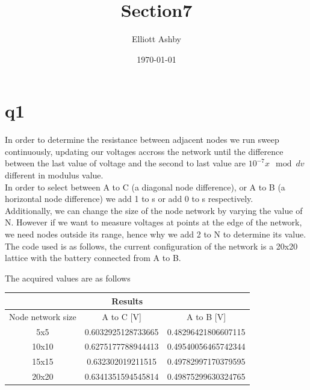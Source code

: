 \documentclass[a4paper,english]{article}
\title{Section7}
\author{Elliott Ashby}
\date{\today}
\begin{document}
    \maketitle
    \section{q1}
    In order to determine the resistance between adjacent nodes we run sweep continuously, updating our voltages accross the network
    until the difference between the last value of voltage and the second to last value are $10^{-7} x \mod{dv}$ different in modulus value.
    \\
    In order to select between A to C (a diagonal node difference), or A to B (a horizontal node difference) we add 1 to s or add 0 to s respectively.
    \\
    Additionally, we can change the size of the node network by varying the value of N. However if we want to measure voltages at points at the edge of
    the network, we need nodes outside its range, hence why we add 2 to N to determine its value.
    \\
    The code used is as follows, the current configuration of the network is a 20x20 lattice with the battery connected from A to B.
    
    The acquired values are as follows
    \begin{center}
        \begin{tabular}{|c||c|c|}
            \hline
            \multicolumn{3}{|c|}{Results} \\
            \hline\hline
            Node network size & A to C [V] & A to B [V] \\
            \hline
            5x5 & 0.6032925128733665 & 0.48296421806607115 \\
            10x10 & 0.6275177788944413 & 0.49540056465742344 \\
            15x15 & 0.632302019211515 & 0.49782997170379595 \\
            20x20 & 0.6341351594545814 & 0.49875299630324765 \\
            \hline
        \end{tabular}
    \end{center}
\end{document}
